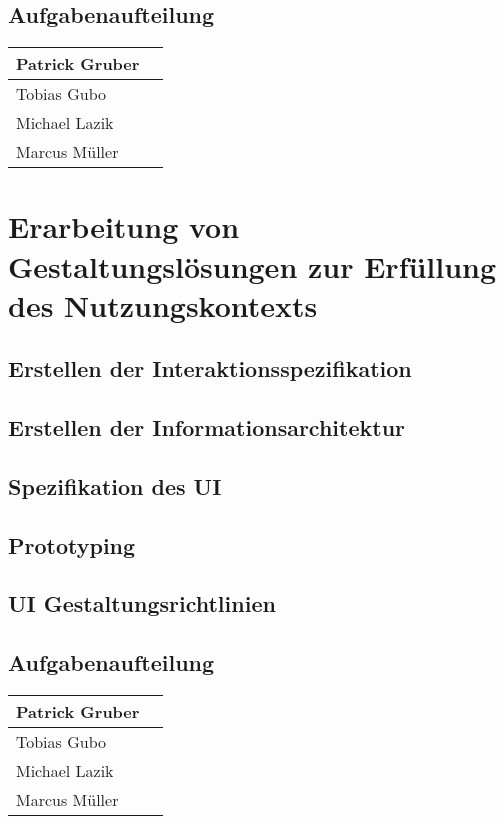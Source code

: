 \documentclass[12pt, a4paper]{scrartcl}
\begin{document}
	\subsection*{Aufgabenaufteilung}
	\begin{tabularx}{0.95\textwidth}{|l|X|}
		\hline
		Patrick Gruber & \\
		\hline
		Tobias Gubo & \\
		\hline
		Michael Lazik & \\
		\hline
		Marcus Müller & \\
		\hline
	\end{tabularx}
	
	\newpage
	
	\section{Erarbeitung von Gestaltungslösungen zur Erfüllung des Nutzungskontexts}
	\blindtext[2]
	\subsection{Erstellen der Interaktionsspezifikation}
	\blindtext[1]
	\subsection{Erstellen der Informationsarchitektur}
	\blindtext[1]
	\subsection{Spezifikation des UI}
	\blindtext[1]
	\subsection{Prototyping}
	\blindtext[1]
	\subsection{UI Gestaltungsrichtlinien}
	\blindtext[1]
	
	\subsection*{Aufgabenaufteilung}
	\begin{tabularx}{0.95\textwidth}{|l|X|}
		\hline
		Patrick Gruber & \\
		\hline
		Tobias Gubo & \\
		\hline
		Michael Lazik & \\
		\hline
		Marcus Müller & \\
		\hline
	\end{tabularx}
	
\end{document}
